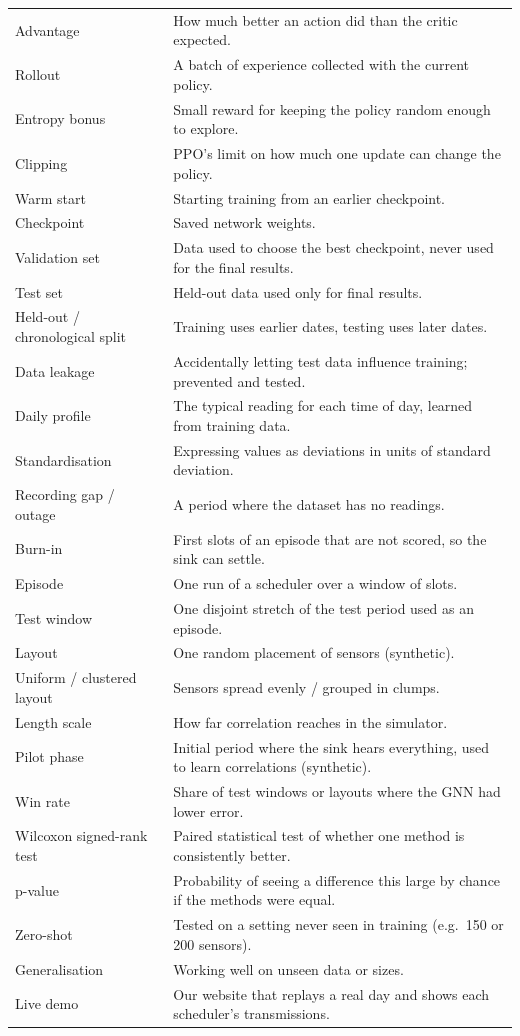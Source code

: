 {\begin{longtable}{@{}p{3.6cm}p{11.8cm}@{}}
Advantage & How much better an action did than the critic expected. \\
Rollout & A batch of experience collected with the current policy. \\
Entropy bonus & Small reward for keeping the policy random enough to explore. \\
Clipping & PPO's limit on how much one update can change the policy. \\
Warm start & Starting training from an earlier checkpoint. \\
Checkpoint & Saved network weights. \\
Validation set & Data used to choose the best checkpoint, never used for the final results. \\
Test set & Held-out data used only for final results. \\
Held-out / chronological split & Training uses earlier dates, testing uses later dates. \\
Data leakage & Accidentally letting test data influence training; prevented and tested. \\
Daily profile & The typical reading for each time of day, learned from training data. \\
Standardisation & Expressing values as deviations in units of standard deviation. \\
Recording gap / outage & A period where the dataset has no readings. \\
Burn-in & First slots of an episode that are not scored, so the sink can settle. \\
Episode & One run of a scheduler over a window of slots. \\
Test window & One disjoint stretch of the test period used as an episode. \\
Layout & One random placement of sensors (synthetic). \\
Uniform / clustered layout & Sensors spread evenly / grouped in clumps. \\
Length scale & How far correlation reaches in the simulator. \\
Pilot phase & Initial period where the sink hears everything, used to learn correlations (synthetic). \\
Win rate & Share of test windows or layouts where the GNN had lower error. \\
Wilcoxon signed-rank test & Paired statistical test of whether one method is consistently better. \\
p-value & Probability of seeing a difference this large by chance if the methods were equal. \\
Zero-shot & Tested on a setting never seen in training (e.g.\ 150 or 200 sensors). \\
Generalisation & Working well on unseen data or sizes. \\
Live demo & Our website that replays a real day and shows each scheduler's transmissions. \\
\bottomrule
\end{longtable}
}
